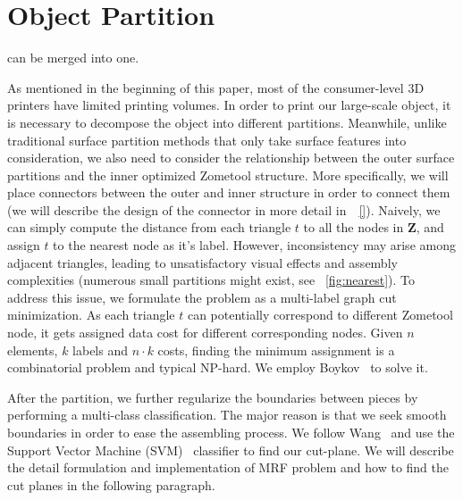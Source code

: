 \section{Object Partition}
\label{sec:surf_part}

 can be merged into one.

As mentioned in the beginning of this paper, most of the consumer-level 3D printers have limited printing volumes.
In order to print our large-scale object, it is necessary to decompose the object into different partitions.
Meanwhile, unlike traditional surface partition methods that only take surface features into consideration, we also need to consider the relationship between the outer surface partitions and the inner optimized Zometool structure.
More specifically, we will place connectors between the outer and inner structure in order to connect them (we will describe the design of the connector in more detail in~\secname~\ref{}).
Naively, we can simply compute the distance from each triangle $t$ to all the nodes in $\mathbf{Z}$, and assign $t$ to the nearest node as it's label.
However, inconsistency may arise among adjacent triangles, leading to unsatisfactory visual effects and assembly complexities (numerous small partitions might exist, see \figname~\ref{fig:nearest}). 
To address this issue, we formulate the problem as a multi-label graph cut minimization.
As each triangle $t$ can potentially correspond to different Zometool node, it gets assigned data cost for different corresponding nodes.
Given $n$ elements, $k$ labels and $n\cdot k$ costs, finding the minimum assignment is a combinatorial problem and typical NP-hard.
We employ Boykov~\cite{boykov:2004:experimental} to solve it.

After the partition, we further regularize the boundaries between pieces by performing a multi-class classification.
The major reason is that we seek smooth boundaries in order to ease the assembling process.
We follow Wang~\cite{wang2016improved} and use the Support Vector Machine (SVM)~\cite{cortes1995support} classifier to find our cut-plane. 
We will describe the detail formulation and implementation of MRF problem and how to find the cut planes in the following paragraph.

